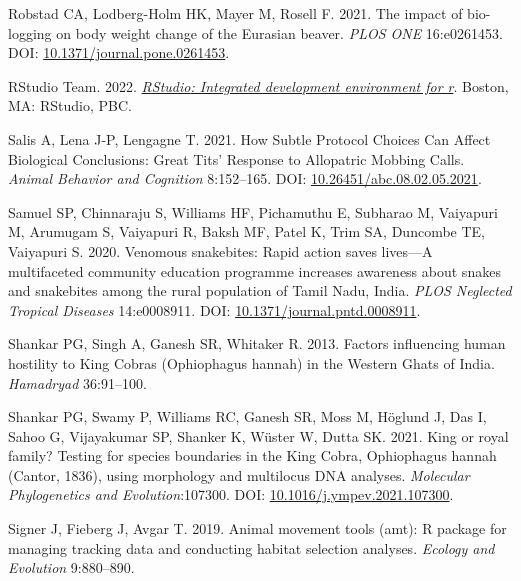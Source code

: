 \documentclass[10pt,a4paper]{article}
\newlength{\cslhangindent}
\newenvironment{CSLReferences}[2] %
 {\begin{list}{}{%
  \setlength{\itemindent}{0pt}
  \setlength{\leftmargin}{0pt}
  \setlength{\parsep}{0pt}
  \ifodd #1
   \setlength{\leftmargin}{\cslhangindent}
   \setlength{\itemindent}{-1\cslhangindent}
  \fi
  \setlength{\itemsep}{#2\baselineskip}}}
 {\end{list}}
\begin{document}
\begin{CSLReferences}{1}{0}
Robstad CA, Lodberg-Holm HK, Mayer M, Rosell F. 2021. The impact of bio-logging on body weight change of the {Eurasian} beaver. \emph{PLOS ONE} 16:e0261453. DOI: \href{https://doi.org/10.1371/journal.pone.0261453}{10.1371/journal.pone.0261453}.

RStudio Team. 2022. \emph{\href{http://www.rstudio.com/}{{RStudio}: Integrated development environment for r}}. Boston, MA: RStudio, PBC.

Salis A, Lena J-P, Lengagne T. 2021. How {Subtle} {Protocol} {Choices} {Can} {Affect} {Biological} {Conclusions}: {Great} {Tits}' {Response} to {Allopatric} {Mobbing} {Calls}. \emph{Animal Behavior and Cognition} 8:152--165. DOI: \href{https://doi.org/10.26451/abc.08.02.05.2021}{10.26451/abc.08.02.05.2021}.

Samuel SP, Chinnaraju S, Williams HF, Pichamuthu E, Subharao M, Vaiyapuri M, Arumugam S, Vaiyapuri R, Baksh MF, Patel K, Trim SA, Duncombe TE, Vaiyapuri S. 2020. Venomous snakebites: {Rapid} action saves lives---{A} multifaceted community education programme increases awareness about snakes and snakebites among the rural population of {Tamil} {Nadu}, {India}. \emph{PLOS Neglected Tropical Diseases} 14:e0008911. DOI: \href{https://doi.org/10.1371/journal.pntd.0008911}{10.1371/journal.pntd.0008911}.

Shankar PG, Singh A, Ganesh SR, Whitaker R. 2013. Factors influencing human hostility to {King} {Cobras} ({Ophiophagus} hannah) in the {Western} {Ghats} of {India}. \emph{Hamadryad} 36:91--100.

Shankar PG, Swamy P, Williams RC, Ganesh SR, Moss M, Höglund J, Das I, Sahoo G, Vijayakumar SP, Shanker K, Wüster W, Dutta SK. 2021. King or royal family? {Testing} for species boundaries in the {King} {Cobra}, {Ophiophagus} hannah ({Cantor}, 1836), using morphology and multilocus {DNA} analyses. \emph{Molecular Phylogenetics and Evolution}:107300. DOI: \href{https://doi.org/10.1016/j.ympev.2021.107300}{10.1016/j.ympev.2021.107300}.

Signer J, Fieberg J, Avgar T. 2019. Animal movement tools (amt): R package for managing tracking data and conducting habitat selection analyses. \emph{Ecology and Evolution} 9:880--890.


\end{CSLReferences}
\end{document}
